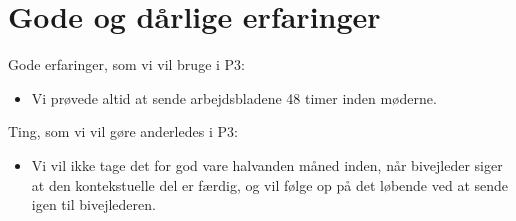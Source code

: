 \section{Gode og d\aa{}rlige erfaringer}
Gode erfaringer, som vi vil bruge i P3:
\begin{itemize}
\item Vi prøvede altid at sende arbejdsbladene 48 timer inden møderne.
\end{itemize}
Ting, som vi vil g\o{}re anderledes i P3:
\begin{itemize}
\item Vi vil ikke tage det for god vare halvanden måned inden, når bivejleder siger at den kontekstuelle del er færdig, og vil følge op på det løbende ved at sende igen til bivejlederen.
\end{itemize}